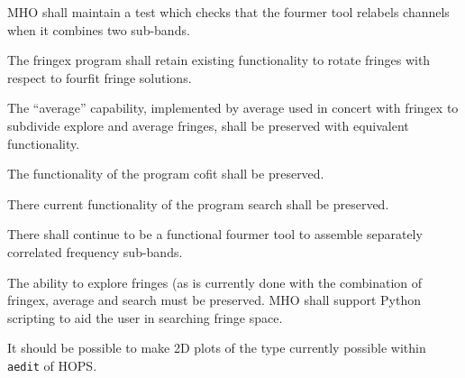 \begin{description}
 \acs{MHO} shall maintain a test which checks that the \acs{fourmer}
tool relabels channels when it combines two sub-bands.

 The \acs{fringex} program shall retain existing functionality to rotate
fringes with respect to fourfit fringe solutions.

 The ``average'' capability, implemented by \acs{average}
      used in concert with \acs{fringex} to subdivide explore and average
      fringes, shall be preserved with equivalent functionality.

 The functionality of the program \acs{cofit} shall be preserved.

 There current functionality of the program \acs{search} shall be preserved.

 There shall continue to be a functional \acs{fourmer} tool
      to assemble separately correlated frequency sub-bands.

 The ability to explore fringes (as is currently done with
    the combination of \acs{fringex}, \acs{average} and search must be
    preserved.  MHO shall support \acs{Python} scripting to aid the user
    in searching fringe space.

 It should be possible to make 2D plots of the type
    currently possible within \texttt{\acs{aedit}} of \acs{HOPS}.


\end{description}
